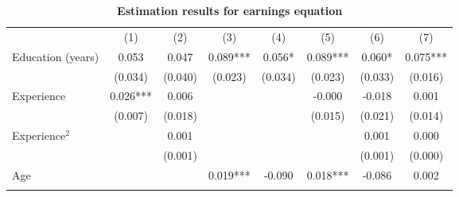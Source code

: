\begin{center}
\begin{table}
\caption{\textbf{Estimation results for earnings equation%
}}\label{tb:MainEstRes}
{\footnotesize 
\begin{tabular}{llllllll}
\hline
\hline
\multicolumn{1}{c}{} &
  \multicolumn{1}{c}{(1)} &
  \multicolumn{1}{c}{(2)} &
  \multicolumn{1}{c}{(3)} &
  \multicolumn{1}{c}{(4)} &
  \multicolumn{1}{c}{(5)} &
  \multicolumn{1}{c}{(6)} &
  \multicolumn{1}{c}{(7)} \\
\cline{1-8}
\multicolumn{1}{l}{Education (years)} &
  \multicolumn{1}{c}{0.053} &
  \multicolumn{1}{c}{0.047} &
  \multicolumn{1}{c}{0.089***} &
  \multicolumn{1}{c}{0.056*} &
  \multicolumn{1}{c}{0.089***} &
  \multicolumn{1}{c}{0.060*} &
  \multicolumn{1}{c}{0.075***} \\
\multicolumn{1}{l}{} &
  \multicolumn{1}{c}{(0.034)} &
  \multicolumn{1}{c}{(0.040)} &
  \multicolumn{1}{c}{(0.023)} &
  \multicolumn{1}{c}{(0.034)} &
  \multicolumn{1}{c}{(0.023)} &
  \multicolumn{1}{c}{(0.033)} &
  \multicolumn{1}{c}{(0.016)} \\
\multicolumn{1}{l}{Experience} &
  \multicolumn{1}{c}{0.026***} &
  \multicolumn{1}{c}{0.006} &
  \multicolumn{1}{c}{} &
  \multicolumn{1}{c}{} &
  \multicolumn{1}{c}{-0.000} &
  \multicolumn{1}{c}{-0.018} &
  \multicolumn{1}{c}{0.001} \\
\multicolumn{1}{l}{} &
  \multicolumn{1}{c}{(0.007)} &
  \multicolumn{1}{c}{(0.018)} &
  \multicolumn{1}{c}{} &
  \multicolumn{1}{c}{} &
  \multicolumn{1}{c}{(0.015)} &
  \multicolumn{1}{c}{(0.021)} &
  \multicolumn{1}{c}{(0.014)} \\
\multicolumn{1}{l}{Experience$^2$} &
  \multicolumn{1}{c}{} &
  \multicolumn{1}{c}{0.001} &
  \multicolumn{1}{c}{} &
  \multicolumn{1}{c}{} &
  \multicolumn{1}{c}{} &
  \multicolumn{1}{c}{0.001} &
  \multicolumn{1}{c}{0.000} \\
\multicolumn{1}{l}{} &
  \multicolumn{1}{c}{} &
  \multicolumn{1}{c}{(0.001)} &
  \multicolumn{1}{c}{} &
  \multicolumn{1}{c}{} &
  \multicolumn{1}{c}{} &
  \multicolumn{1}{c}{(0.001)} &
  \multicolumn{1}{c}{(0.000)} \\
\multicolumn{1}{l}{Age} &
  \multicolumn{1}{c}{} &
  \multicolumn{1}{c}{} &
  \multicolumn{1}{c}{0.019***} &
  \multicolumn{1}{c}{-0.090} &
  \multicolumn{1}{c}{0.018***} &
  \multicolumn{1}{c}{-0.086} &
  \multicolumn{1}{c}{0.002} \\
\multicolumn{1}{l}{} &
  \multicolumn{1}{c}{} &
  \multicolumn{1}{c}{} &

\end{tabular}}
\end{table}
\end{center}
